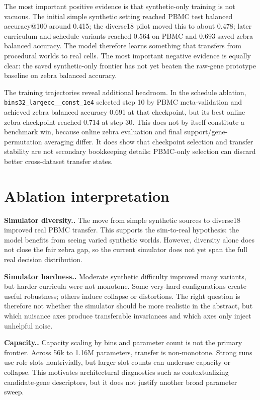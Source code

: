 \documentclass{article}
\newcommand{\myparagraph}[1]{\noindent\textbf{#1.} }
\begin{document}
The most important positive evidence is that synthetic-only training is not vacuous. The initial simple synthetic setting reached PBMC test balanced accuracy@100 around 0.415; the diverse18 pilot moved this to about 0.478; later curriculum and schedule variants reached 0.564 on PBMC and 0.693 saved zebra balanced accuracy. The model therefore learns something that transfers from procedural worlds to real cells. The most important negative evidence is equally clear: the saved synthetic-only frontier has not yet beaten the raw-gene prototype baseline on zebra balanced accuracy.

The training trajectories reveal additional headroom. In the schedule ablation, \texttt{bins32\_largecc\_\_const\_1e4} selected step 10 by PBMC meta-validation and achieved zebra balanced accuracy 0.691 at that checkpoint, but its best online zebra checkpoint reached 0.714 at step 30. This does not by itself constitute a benchmark win, because online zebra evaluation and final support/gene-permutation averaging differ. It does show that checkpoint selection and transfer stability are not secondary bookkeeping details: PBMC-only selection can discard better cross-dataset transfer states.

\section{Ablation interpretation}

\myparagraph{Simulator diversity.}
The move from simple synthetic sources to diverse18 improved real PBMC transfer. This supports the sim-to-real hypothesis: the model benefits from seeing varied synthetic worlds. However, diversity alone does not close the fair zebra gap, so the current simulator does not yet span the full real decision distribution.

\myparagraph{Simulator hardness.}
Moderate synthetic difficulty improved many variants, but harder curricula were not monotone. Some very-hard configurations create useful robustness; others induce collapse or distortions. The right question is therefore not whether the simulator should be more realistic in the abstract, but which nuisance axes produce transferable invariances and which axes only inject unhelpful noise.

\myparagraph{Capacity.}
Capacity scaling by bins and parameter count is not the primary frontier. Across 56k to 1.16M parameters, transfer is non-monotone. Strong runs use role slots nontrivially, but larger slot counts can underuse capacity or collapse. This motivates architectural diagnostics such as contextualizing candidate-gene descriptors, but it does not justify another broad parameter sweep.
\end{document}
